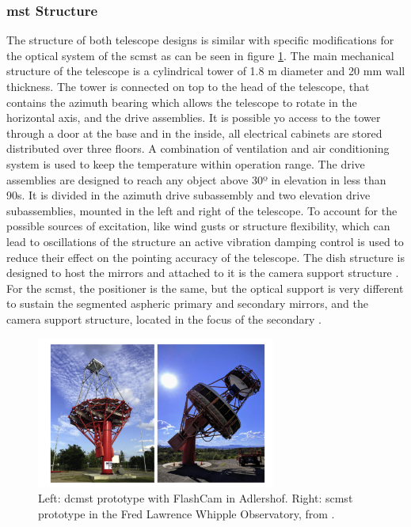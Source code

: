 \documentclass[main.tex]{subfiles}
\begin{document}
\subsubsection{\gls{mst} Structure}

The structure of both telescope designs is similar with specific modifications for the optical system of the \gls{scmst} \cite{2017SCMSTstatus} as can be seen in figure \ref{fig:2MST}.
The main mechanical structure of the telescope is a cylindrical tower of 1.8 m diameter and 20 mm wall thickness. The tower is connected on top to the head of the telescope, that contains the azimuth bearing which allows the telescope to rotate in the horizontal axis, and the drive assemblies. It is possible yo access to the tower through a door at the base and in the inside, all electrical cabinets are stored distributed over three floors. A combination of ventilation and air conditioning system is used to keep the temperature within operation range.
The drive assemblies are designed to reach any object above 30º in elevation in less than 90s. It is divided in the azimuth drive subassembly and two elevation drive subassemblies, mounted in the left and right of the telescope.
To account for the possible sources of excitation, like wind gusts or structure flexibility, which can lead to oscillations of the structure an active vibration damping control is used to reduce their effect on the pointing accuracy of the telescope.
The dish structure is designed to host the mirrors and attached to it is the camera support structure \cite{2015DCMSTstatus}.
For the \gls{scmst}, the positioner is the same, but the optical support is very different to sustain the segmented aspheric primary and secondary mirrors, and the camera support structure, located in the focus of the secondary \cite{2018MSTandLSTstatus}.


\begin{figure}
\centering
 \includegraphics[width=0.7\textwidth]{Pictures/2MSTpictures.pdf}
  \caption{Left: \gls{dcmst} prototype with FlashCam in Adlershof. Right: \gls{scmst} prototype in the Fred Lawrence Whipple Observatory, from \cite{2018MSTandLSTstatus}.}
    \label{fig:2MST}
\end{figure}
\end{document}
